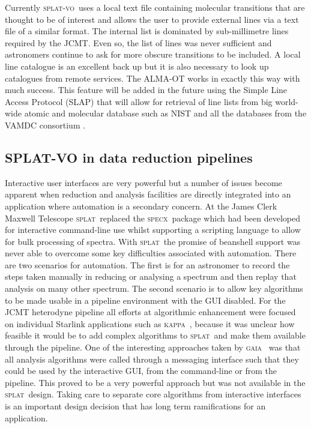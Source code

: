 \documentclass[final,authoryear,5p,times,twocolumn]{elsarticle}
\newcommand{\splat}{\textsc{splat}}
\newcommand{\splatvo}{\textsc{splat-vo}}
\newcommand{\gaia}{\textsc{gaia}}
\newcommand{\KAPPA}{\textsc{kappa}}
\newcommand{\specx}{\textsc{specx}}
\newcommand{\ascl}[1]{\href{http://www.ascl.net/#1}{ascl:#1}}
\begin{document}
Currently \splatvo\ uses a local text file containing molecular
transitions that are thought to be of interest and allows the user to
provide external lines via a text file of a similar format. The
internal list is dominated by sub-millimetre lines required by the
JCMT. Even so, the list of lines was never sufficient and astronomers
continue to ask for more obscure transitions to be included. A local
line catalogue is an excellent back up but it is also necessary to
look up catalogues from remote services. The ALMA-OT
\citep{2013ASPC..475..373W} works in exactly this way with much
success. This feature will be added in the future using the Simple
Line Access Protocol (SLAP) that will allow for retrieval of line
lists from big world-wide atomic and molecular database such as NIST
\citep{NIST_ASD,2012APS..DMP.D1004K,2004JPCRD..33..177L} and all the
databases from the VAMDC consortium \citep{2011BaltA..20..503K}.


\subsection{SPLAT-VO in data reduction pipelines}

Interactive user interfaces are very powerful but a number of issues
become apparent when reduction and analysis facilities are directly
integrated into an application where automation is a secondary
concern.  At the James Clerk Maxwell Telescope \splat\ replaced the
\specx\ package \citep[][\ascl{1310.008}]{specx} which had been
developed for interactive command-line use whilst supporting a
scripting language to allow for bulk processing of spectra. With \splat\
the promise of beanshell support was never able to overcome some key
difficulties associated with automation. There are two scenarios for
automation. The first is for an astronomer to record the steps taken
manually in reducing or analysing a spectrum and then replay that
analysis on many other spectrum. The second scenario is to allow key
algorithms to be made usable in a pipeline environment with the GUI
disabled. For the JCMT heterodyne pipeline
\citep[][\ascl{1310.001}]{2008ASPC..394..565J,JennessACSISDR} all efforts at algorithmic
enhancement were focused on individual Starlink applications such as
\KAPPA\ \citep[][\ascl{1403.022}]{sun95}, because it was unclear how
feasible it would be to add complex algorithms to \splat\ and make them
available through the pipeline. One of the interesting approaches
taken by \gaia\ \citep{2009ASPC..411..575D} was that all analysis
algorithms were called through a messaging interface such that they
could be used by the interactive GUI, from the command-line or from
the pipeline. This proved to be a very powerful approach but was not
available in the \splat\ design. Taking care to separate core algorithms
from interactive interfaces is an important design decision that has
long term ramifications for an application.
\end{document}
